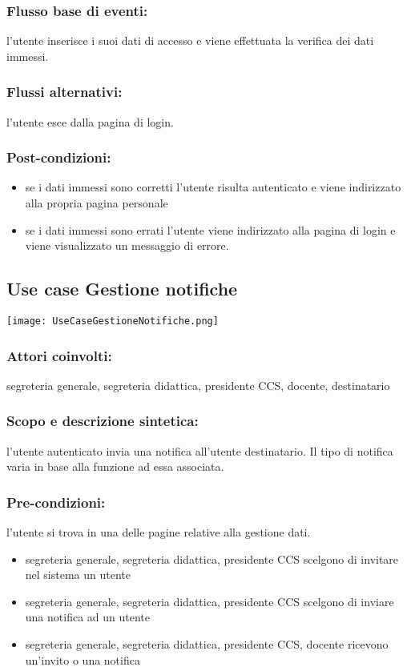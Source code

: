 \documentclass[11pt,a4paper]{article}
\begin{document}
\subsubsection*{Flusso base di eventi:}
l'utente inserisce i suoi dati di accesso e viene effettuata la verifica dei dati immessi.
\subsubsection*{Flussi alternativi:}
l'utente esce dalla pagina di login.
\subsubsection*{Post-condizioni:}
\begin{itemize}
 \item se i dati immessi sono corretti l'utente risulta autenticato e viene indirizzato alla propria pagina personale
 \item se i dati immessi sono errati l'utente viene indirizzato alla pagina di login e viene visualizzato un messaggio di errore. 
\end{itemize}

\subsection{Use case Gestione notifiche}
\begin{center} 
 \texttt{[image: UseCaseGestioneNotifiche.png]} 
\end{center}
\subsubsection*{Attori coinvolti:}
segreteria generale, segreteria didattica, presidente CCS, docente, destinatario
\subsubsection*{Scopo e descrizione sintetica:}
l'utente autenticato invia una notifica all'utente destinatario. Il tipo di notifica varia in base alla funzione ad essa associata.
\subsubsection*{Pre-condizioni:}
l'utente si trova in una delle pagine relative alla gestione dati.
\begin{itemize}
 \item segreteria generale, segreteria didattica, presidente CCS scelgono di invitare nel sistema un utente
\item segreteria generale, segreteria didattica, presidente CCS scelgono di inviare una notifica ad un utente
\item  segreteria generale, segreteria didattica, presidente CCS, docente ricevono un'invito o una notifica
\end{itemize}
\end{document}
